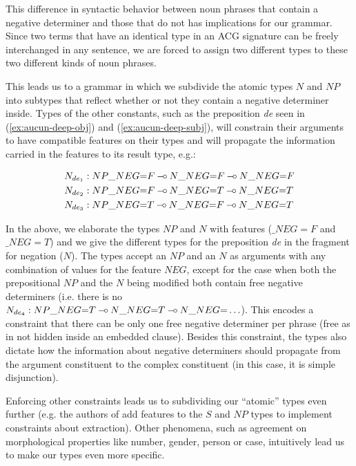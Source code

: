 \documentclass{llncs}
\def\limp {\mathbin{{-}\mkern-3.5mu{\circ}}}
\begin{document}
This difference in syntactic behavior between noun phrases that contain a
negative determiner and those that do not has implications for our
grammar. Since two terms that have an identical type in an ACG signature can
be freely interchanged in any sentence, we are forced to assign two different
types to these two different kinds of noun phrases.


This leads us to a grammar in which we subdivide the atomic types $N$
and $NP$ into subtypes that reflect whether or not they contain a
negative determiner inside. Types of the other constants, such as the
preposition \emph{de} seen in (\ref{ex:aucun-deep-obj}) and
(\ref{ex:aucun-deep-subj}), will constrain their arguments to have
compatible features on their types and will propagate the information
carried in the features to its result type, e.g.:

\begin{align*}
N_{de_1} &: NP\_NEG{=}F \limp N\_NEG{=}F \limp N\_NEG{=}F \\
N_{de_2} &: NP\_NEG{=}F \limp N\_NEG{=}T \limp N\_NEG{=}T \\
N_{de_3} &: NP\_NEG{=}T \limp N\_NEG{=}F \limp N\_NEG{=}T
\end{align*}

In the above, we elaborate the types $NP$ and $N$ with features ($\_NEG{=}F$
and $\_NEG{=}T$) and we give the different types for the preposition \emph{de}
in the fragment for negation ($N$). The types accept an $NP$ and an $N$ as
arguments with any combination of values for the feature $NEG$, except for the
case when both the prepositional $NP$ and the $N$ being modified both contain
free negative determiners (i.e. there is no $N_{de_4} : NP\_NEG{=}T \limp
N\_NEG{=}T \limp N\_NEG{=}\ldots$). This encodes a constraint that there can
be only one free negative determiner per phrase (free as in not hidden inside
an embedded clause). Besides this constraint, the types also dictate how the
information about negative determiners should propagate from the argument
constituent to the complex constituent (in this case, it is simple
disjunction).

Enforcing other constraints leads us to subdividing our ``atomic'' types even
further (e.g. the authors of \cite{pogodalla2012controlling} add features to
the $S$ and $NP$ types to implement constraints about extraction). Other
phenomena, such as agreement on morphological properties like number, gender,
person or case, intuitively lead us to make our types even more specific.
\end{document}
